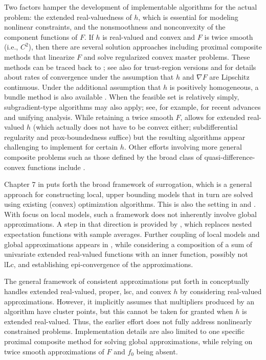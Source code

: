 \documentclass[smallextended,envcountsect]{svjour3}
\begin{document}
Two factors hamper the development of implementable algorithms for the actual problem: the extended real-valuedness of $h$, which is essential for modeling nonlinear constraints, and the nonsmoothness and nonconvexity of the component functions of $F$. If $h$ is real-valued and convex and $F$ is twice smooth (i.e., $C^2$), then there are several solution approaches including proximal composite methods that linearize $F$ and solve regularized convex master problems. These methods can be traced back to \cite{Fletcher1982,Powell1983,Burke1985}; see also \cite{Powell1984,Yuan1985,BurkeFerris1995} for trust-region versions and \cite{Drusvyatskiy2019} for details about rates of convergence under the assumption that $h$ and $\nabla F$ are Lipschitz continuous. Under the additional assumption that $h$ is positively homogeneous, a bundle method is also available \cite{Sagastizabal_2013}. When the feasible set is relatively simply, subgradient-type algorithms may also apply; see, for example, \cite{LiCui2025a} for recent advances and unifying analysis. While retaining a twice smooth $F$, \cite{LewisWright.16} allows for extended real-valued $h$ (which actually does not have to be convex either; subdifferential regularity and prox-boundedness suffice) but the resulting algorithms appear challenging to implement for certain $h$. Other efforts involving more general composite problems such as those defined by the broad class of quasi-difference-convex functions include \cite{PangPeng2025}. 

Chapter 7 in \cite{Cui_Pang_2022} puts forth the broad framework of surrogation, which is a general approach for constructing local, upper bounding models that in turn are solved using existing (convex) optimization algorithms. This is also the setting in \cite{Syrtseva_2024} and \cite{Sempere_Oliveira_Royset_2025}. With  focus on local models, such a framework does not inherently involve global approximations. A step in that direction is provided by \cite{Liu2022a}, which replaces nested expectation functions with sample averages. Further coupling of local models and global approximations appears in \cite{LiCui2025b}, while considering a composition of a sum of univariate extended real-valued functions with an inner function, possibly not lLc, and establishing epi-convergence of the approximations. 

The general framework of consistent approximations put forth in \cite{Royset2023a} conceptually handles extended real-valued, proper, lsc, and convex $h$ by considering real-valued approximations. However, it implicitly assumes that multipliers produced by an algorithm have cluster points, but this cannot be taken for granted when $h$ is extended real-valued. Thus, the earlier effort does not fully address nonlinearly constrained problems. Implementation details are also limited to one specific proximal composite method for solving global approximations, while relying on twice smooth approximations of $F$ and $f_0$ being absent.
\end{document}
